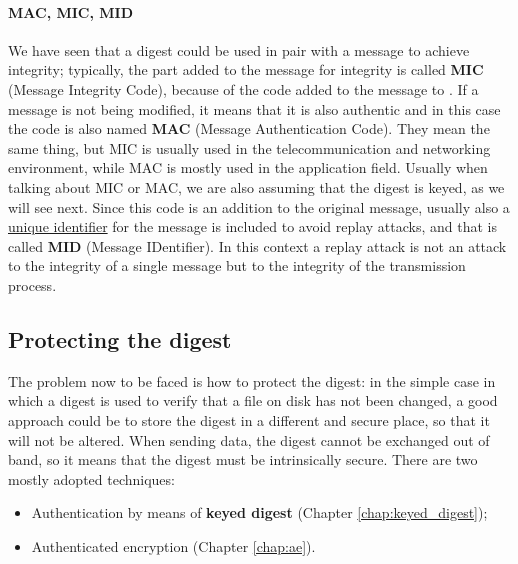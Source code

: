 \paragraph*{MAC, MIC, MID}
We have seen that a digest could be used in pair with a message to achieve integrity; typically, the part added
to the message for integrity is called \textbf{MIC} (Message Integrity Code), because of the code added to the message
to . If a message is not being modified, it means that it is also authentic and in this case the code is also named \textbf{MAC} (Message Authentication Code). They mean the same thing, but MIC is usually used
in the telecommunication and networking environment, while MAC is mostly used in the application field.
Usually when talking about MIC or MAC, we are also assuming that the digest is keyed, as we will see next.
Since this code is an addition to the original message, usually also a \underline{unique identifier} for the message is
included to avoid replay attacks, and that is called \textbf{MID} (Message IDentifier). In this context a replay attack
is not an attack to the integrity of a single message but to the integrity of the transmission process.


\subsection{Protecting the digest}
The problem now to be faced is how to protect the digest: in the simple case in which a digest is used to verify
that a file on disk has not been changed, a good approach could be to store the digest in a different and secure
place, so that it will not be altered. When sending data, the digest cannot be exchanged out of band, so it means
that the digest must be intrinsically secure. There are two mostly adopted techniques:
\begin{itemize}
    \item Authentication by means of \textbf{keyed digest} (Chapter \ref{chap:keyed_digest});
    \item Authenticated encryption (Chapter \ref{chap:ae}).
\end{itemize}

